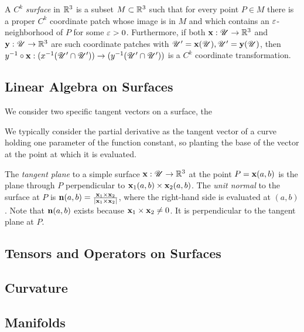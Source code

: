 \begin{defn}
  A $C^k$ \emph{surface} in $\mathbb{R}^3$ is a subset $M \subset \mathbb{R}^3$ such that for every point $P \in M$ there is a proper $C^k$ coordinate patch whose image is in $M$ and which contains an $\varepsilon$-neighborhood of $P$ for some $\varepsilon > 0$. Furthermore, if both $\mathbf{x}: \mathscr{U} \to \mathbb{R}^3$ and $\mathbf{y}: \mathscr{U} \to \mathbb{R}^3$ are such coordinate patches with $\mathscr{U}^\prime = \mathbf{x}(\mathscr{U}), \mathscr{U}^\prime = \mathbf{y}(\mathscr{U})$, then $y^{-1} \circ \mathbf{x}: (x^{-1}(\mathscr{U}^\prime \cap \mathscr{U}^\prime)) \to (y^{-1}(\mathscr{U}^\prime \cap \mathscr{U}^\prime))$ is a $C^k$ coordinate transformation.
\end{defn}

\subsection{Linear Algebra on Surfaces}

\begin{defn}
  We consider two specific tangent vectors on a surface, the 
\end{defn}

\begin{unno_rem}
  We typically consider the partial derivative as the tangent vector of a curve holding one parameter of the function constant, so planting the base of the vector at the point at which it is evaluated.
\end{unno_rem}



\begin{defn}
  The \emph{tangent plane} to a simple surface  $\mathbf{x}: \mathscr{U} \to \mathbb{R}^3$ at the point $P = \mathbf{x}(a, b)$ is the plane through $P$ perpendicular to $\mathbf{x}_1(a, b) \times \mathbf{x}_2(a, b)$. The \emph{unit normal} to the surface at $P$ is $\mathbf{n}(a, b) = \frac{\mathbf{x}_1 \times \mathbf{x}_2}{\left|\mathbf{x}_1 \times \mathbf{x}_2\right|}$, where the right-hand side is evaluated at $(a, b)$. Note that $\mathbf{n}(a, b)$ exists because $\mathbf{x}_1 \times \mathbf{x}_2 \neq 0$. It is perpendicular to the tangent plane at $P$.
\end{defn}

\subsection{Tensors and Operators on Surfaces}

\subsection{Curvature}

\subsection{Manifolds}